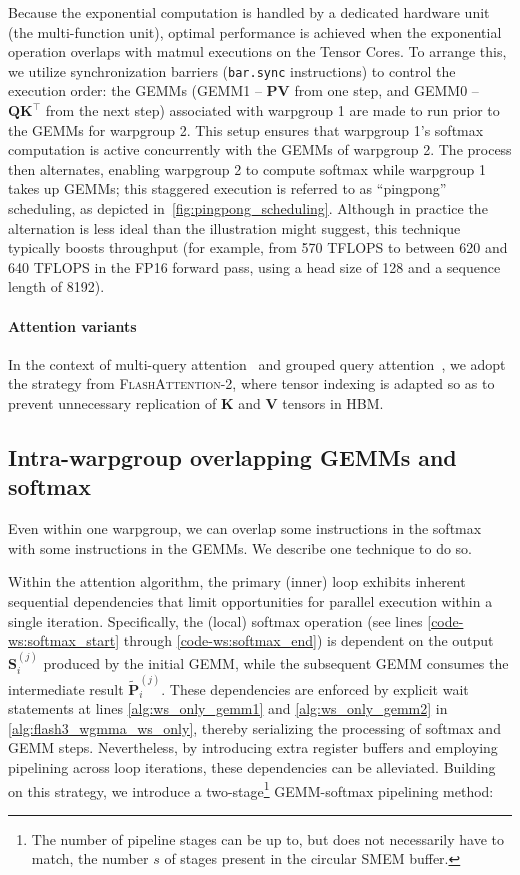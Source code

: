Because the exponential computation is handled by a dedicated hardware unit (the multi-function unit), optimal performance is achieved when the exponential operation overlaps with matmul executions on the Tensor Cores. To arrange this, we utilize synchronization barriers (\texttt{bar.sync} instructions) to control the execution order: the GEMMs (GEMM1 -- $\mathbf{P} \mathbf{V}$ from one step, and GEMM0 -- $\mathbf{Q} \mathbf{K}^\top$
from the next step) associated with warpgroup 1 are made to run prior to the GEMMs for warpgroup 2. This setup ensures that warpgroup 1's softmax computation is active concurrently with the GEMMs of warpgroup 2. The process then alternates, enabling warpgroup 2 to compute softmax while warpgroup 1 takes up GEMMs; this staggered execution is referred to as ``pingpong'' scheduling, as depicted in~\cref{fig:pingpong_scheduling}. Although in practice the alternation is less ideal than the illustration might suggest, this technique typically boosts throughput (for example, from 570 TFLOPS to between 620 and 640 TFLOPS in the FP16 forward pass, using a head size of 128 and a sequence length of 8192).

\paragraph{Attention variants} In the context of multi-query attention~\citep{shazeer2019fast} and grouped query attention~\citep{ainslie2023gqa}, we adopt the strategy from \textsc{FlashAttention-2}, where tensor indexing is adapted so as to prevent unnecessary replication of $\mathbf{K}$ and $\mathbf{V}$ tensors in HBM.

\subsection{Intra-warpgroup overlapping GEMMs and softmax}

Even within one warpgroup, we can overlap some instructions in the softmax with some instructions in the GEMMs. We describe one technique to do so.

Within the attention algorithm, the primary (inner) loop exhibits inherent sequential dependencies that limit opportunities for parallel execution within a single iteration. Specifically, the (local) softmax operation (see lines \ref{code-ws:softmax_start} through \ref{code-ws:softmax_end}) is dependent on the output $\mathbf{S}_i^{(j)}$ produced by the initial GEMM, while the subsequent GEMM consumes the intermediate result $\widetilde{\mathbf{P}}_i^{(j)}$. These dependencies are enforced by explicit wait statements at lines \ref{alg:ws_only_gemm1} and \ref{alg:ws_only_gemm2} in \cref{alg:flash3_wgmma_ws_only}, thereby serializing the processing of softmax and GEMM steps. Nevertheless, by introducing extra register buffers and employing pipelining across loop iterations, these dependencies can be alleviated. Building on this strategy, we introduce a two-stage\footnote{The number of pipeline stages can be up to, but does not necessarily have to match, the number $s$ of stages present in the circular SMEM buffer.} GEMM-softmax pipelining method:

